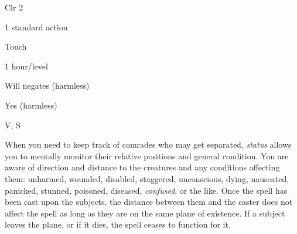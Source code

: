 
\begin{description*}
\item[Level:] Clr 2
\item[Casting Time:] 1 standard action
\item[Range:] Touch
\item[Duration:] 1 hour/level
\item[Saving Throw:] Will negates (harmless)
\item[Spell Resistance:] Yes (harmless)
\item[Components:] V, S
\end{description*}

When you need to keep track of comrades who may get separated, \textit{status} allows
you to mentally monitor their relative positions and general condition. You are
aware of direction and distance to the creatures and any conditions affecting them:
unharmed, wounded, disabled, staggered, unconscious, dying, nauseated, panicked,
stunned, poisoned, diseased, \textit{confused}, or the like. Once the spell has
been cast upon the subjects, the distance between them and the caster does not
affect the spell as long as they are on the same plane of existence. If a subject
leaves the plane, or if it dies, the spell ceases to function for it.